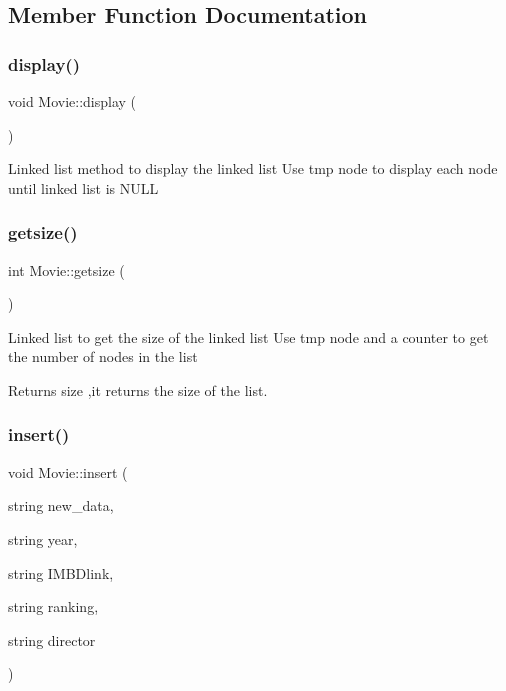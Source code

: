 \subsection{Member Function Documentation}
\mbox{\label{classMovie_ac363bb217f26e9a82eda201df3985600}} 
\subsubsection{\texorpdfstring{display()}{display()}}
{\footnotesize\ttfamily void Movie\+::display (\begin{DoxyParamCaption}{ }\end{DoxyParamCaption})\hspace{0.3cm}{\ttfamily [inline]}}

Linked list method to display the linked list Use tmp node to display each node until linked list is N\+U\+LL \mbox{\label{classMovie_af9b0909f4df25af7a9127211fbb17c1f}} 
\subsubsection{\texorpdfstring{getsize()}{getsize()}}
{\footnotesize\ttfamily int Movie\+::getsize (\begin{DoxyParamCaption}{ }\end{DoxyParamCaption})\hspace{0.3cm}{\ttfamily [inline]}}

Linked list to get the size of the linked list Use tmp node and a counter to get the number of nodes in the list \begin{DoxyReturn}{Returns}
size ,it returns the size of the list. 
\end{DoxyReturn}
\mbox{\label{classMovie_ac77654f0f844f7ed5375a328870feb56}} 
\subsubsection{\texorpdfstring{insert()}{insert()}}
{\footnotesize\ttfamily void Movie\+::insert (\begin{DoxyParamCaption}\item[{string}]{new\+\_\+data,  }\item[{string}]{year,  }\item[{string}]{I\+M\+B\+Dlink,  }\item[{string}]{ranking,  }\item[{string}]{director }\end{DoxyParamCaption})\hspace{0.3cm}{\ttfamily [inline]}}


